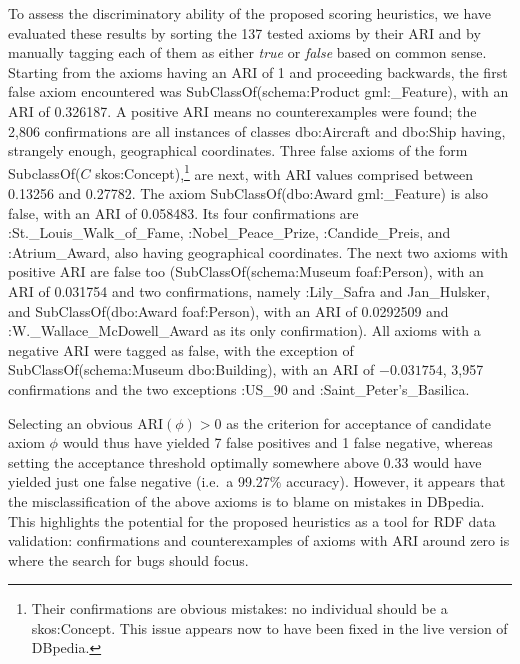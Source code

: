 \documentclass{llncs}
\begin{document}
To assess the discriminatory ability of the proposed scoring heuristics,
we have evaluated these results by sorting the
137
tested axioms by their ARI and by manually tagging each of them as either \emph{true} or \emph{false} based on common sense.
Starting from the axioms having an ARI of 1 and proceeding backwards, the first
false axiom encountered was \textsf{SubClassOf(schema:Product gml:\_Feature)},
with an ARI of 0.326187. A positive ARI means no counterexamples were found;
the 2,806 confirmations are all instances of classes \textsf{dbo:Aircraft} and
\textsf{dbo:Ship} having, strangely enough, geographical coordinates.
Three false axioms of the form \textsf{SubclassOf($C$ skos:Concept)},\footnote{Their
confirmations are obvious mistakes: no individual should be a \textsf{skos:Concept}.
This issue appears now to have been fixed in the live version of DBpedia.}
are next, with ARI values comprised between 0.13256 and 0.27782.
The axiom \textsf{SubClassOf(dbo:Award gml:\_Feature)} is also false, with
an ARI of 0.058483. Its four confirmations are \textsf{:St.\_Louis\_Walk\_of\_Fame},
\textsf{:Nobel\_Peace\_Prize}, \textsf{:Candide\_Preis}, and \textsf{:Atrium\_Award},
also having geographical coordinates. The next two axioms with positive ARI are
false too (\textsf{SubClassOf(sche\-ma:Museum foaf:Person)}, with an ARI of 0.031754
and two confirmations, namely \textsf{:Lily\_Safra} and \textsf{Jan\_Hulsker},
and \textsf{SubClassOf(dbo:Award foaf:Person)}, with an ARI of 0.0292509 and
\textsf{:W.\_Wallace\_Mc\-Dowell\_Award} as its only confirmation).
All axioms with a negative ARI were tagged as false, with the exception of
\textsf{SubClassOf(schema:Museum dbo:Building)}, with an ARI of $-0.031754$,
3,957 confirmations and the two exceptions \textsf{:US\_90} and
\textsf{:Saint\_Peter's\_Basilica}.

Selecting an obvious $\mathrm{ARI}(\phi)>0$ as the criterion for acceptance of candidate axiom $\phi$
would thus have yielded 7 false positives and 1 false negative, whereas setting
the acceptance threshold optimally somewhere above 0.33 would have yielded
just one false negative (i.e.\ a
99.27\%
accuracy).
However, it appears that the misclassification of the above axioms is to blame
on mistakes in DBpedia. This highlights the potential for the proposed heuristics
as a tool for RDF data validation: confirmations and counterexamples of axioms
with ARI around zero is where the search for bugs should focus.
\end{document}
